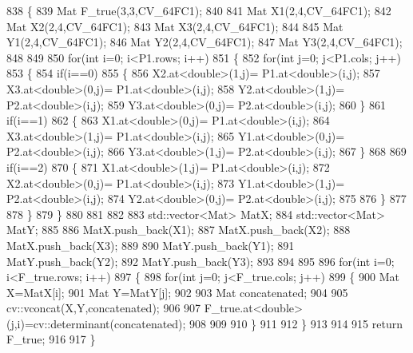 \begin{DoxyCode}
838 \{
839     Mat F\_true(3,3,CV\_64FC1);
840 
841     Mat X1(2,4,CV\_64FC1);
842     Mat X2(2,4,CV\_64FC1);
843     Mat X3(2,4,CV\_64FC1);
844 
845     Mat Y1(2,4,CV\_64FC1);
846     Mat Y2(2,4,CV\_64FC1);
847     Mat Y3(2,4,CV\_64FC1);
848 
849 
850     \textcolor{keywordflow}{for}(\textcolor{keywordtype}{int} i=0; i<P1.rows; i++)
851     \{
852         \textcolor{keywordflow}{for}(\textcolor{keywordtype}{int} j=0; j<P1.cols; j++)
853         \{
854             \textcolor{keywordflow}{if}(i==0)
855             \{
856                 X2.at<\textcolor{keywordtype}{double}>(1,j)= P1.at<\textcolor{keywordtype}{double}>(i,j);
857                 X3.at<\textcolor{keywordtype}{double}>(0,j)= P1.at<\textcolor{keywordtype}{double}>(i,j);
858                 Y2.at<\textcolor{keywordtype}{double}>(1,j)= P2.at<\textcolor{keywordtype}{double}>(i,j);
859                 Y3.at<\textcolor{keywordtype}{double}>(0,j)= P2.at<\textcolor{keywordtype}{double}>(i,j);
860             \}
861             \textcolor{keywordflow}{if}(i==1)
862             \{
863                 X1.at<\textcolor{keywordtype}{double}>(0,j)= P1.at<\textcolor{keywordtype}{double}>(i,j);
864                 X3.at<\textcolor{keywordtype}{double}>(1,j)= P1.at<\textcolor{keywordtype}{double}>(i,j);
865                 Y1.at<\textcolor{keywordtype}{double}>(0,j)= P2.at<\textcolor{keywordtype}{double}>(i,j);
866                 Y3.at<\textcolor{keywordtype}{double}>(1,j)= P2.at<\textcolor{keywordtype}{double}>(i,j);
867             \}
868 
869             \textcolor{keywordflow}{if}(i==2)
870             \{
871                 X1.at<\textcolor{keywordtype}{double}>(1,j)= P1.at<\textcolor{keywordtype}{double}>(i,j);
872                 X2.at<\textcolor{keywordtype}{double}>(0,j)= P1.at<\textcolor{keywordtype}{double}>(i,j);
873                 Y1.at<\textcolor{keywordtype}{double}>(1,j)= P2.at<\textcolor{keywordtype}{double}>(i,j);
874                 Y2.at<\textcolor{keywordtype}{double}>(0,j)= P2.at<\textcolor{keywordtype}{double}>(i,j);
875 
876             \}
877 
878         \}
879     \}
880 
881 
882 
883     std::vector<Mat> MatX;
884     std::vector<Mat> MatY;
885 
886     MatX.push\_back(X1);
887     MatX.push\_back(X2);
888     MatX.push\_back(X3);
889 
890     MatY.push\_back(Y1);
891     MatY.push\_back(Y2);
892     MatY.push\_back(Y3);
893 
894 
895 
896     \textcolor{keywordflow}{for}(\textcolor{keywordtype}{int} i=0; i<F\_true.rows; i++)
897     \{
898         \textcolor{keywordflow}{for}(\textcolor{keywordtype}{int} j=0; j<F\_true.cols; j++)
899         \{
900             Mat X=MatX[i];
901             Mat Y=MatY[j];
902 
903             Mat concatenated;
904 
905             cv::vconcat(X,Y,concatenated);
906 
907             F\_true.at<\textcolor{keywordtype}{double}>(j,i)=cv::determinant(concatenated);
908 
909 
910         \}
911 
912     \}
913 
914 
915     \textcolor{keywordflow}{return} F\_true;
916 
917 \}
\end{DoxyCode}
